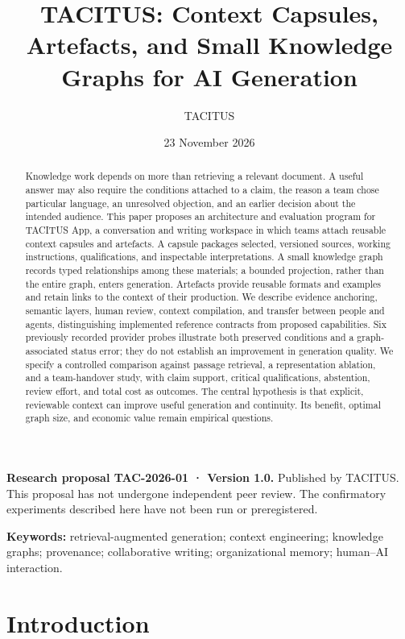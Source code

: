 \documentclass[
  11pt,
]{article}
\title{TACITUS: Context Capsules, Artefacts, and Small Knowledge Graphs
for AI Generation}
\author{TACITUS}
\date{23 November 2026}
\let\originalsection\section
\renewcommand{\section}{\Needspace{5\baselineskip}\originalsection}
\begin{document}
\maketitle
\begin{abstract}
Knowledge work depends on more than retrieving a relevant document. A
useful answer may also require the conditions attached to a claim, the
reason a team chose particular language, an unresolved objection, and an
earlier decision about the intended audience. This paper proposes an
architecture and evaluation program for TACITUS App, a conversation and
writing workspace in which teams attach reusable context capsules and
artefacts. A capsule packages selected, versioned sources, working
instructions, qualifications, and inspectable interpretations. A small
knowledge graph records typed relationships among these materials; a
bounded projection, rather than the entire graph, enters generation.
Artefacts provide reusable formats and examples and retain links to the
context of their production. We describe evidence anchoring, semantic
layers, human review, context compilation, and transfer between people
and agents, distinguishing implemented reference contracts from proposed
capabilities. Six previously recorded provider probes illustrate both
preserved conditions and a graph-associated status error; they do not
establish an improvement in generation quality. We specify a controlled
comparison against passage retrieval, a representation ablation, and a
team-handover study, with claim support, critical qualifications,
abstention, review effort, and total cost as outcomes. The central
hypothesis is that explicit, reviewable context can improve useful
generation and continuity. Its benefit, optimal graph size, and economic
value remain empirical questions.
\end{abstract}

\textbf{Research proposal TAC-2026-01 · Version 1.0.} Published by
TACITUS. This proposal has not undergone independent peer review. The
confirmatory experiments described here have not been run or
preregistered.

\textbf{Keywords:} retrieval-augmented generation; context engineering;
knowledge graphs; provenance; collaborative writing; organizational
memory; human--AI interaction.

\section{Introduction}\label{introduction}
\end{document}
